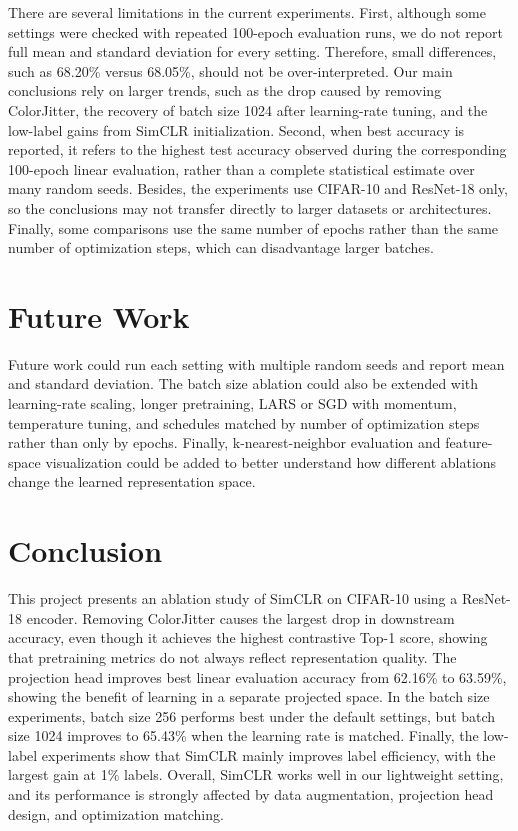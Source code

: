 \documentclass[10pt]{article}
\begin{document}
There are several limitations in the current experiments. First, although some settings were checked with repeated 100-epoch evaluation runs, we do not report full mean and standard deviation for every setting. Therefore, small differences, such as 68.20\% versus 68.05\%, should not be over-interpreted. Our main conclusions rely on larger trends, such as the drop caused by removing ColorJitter, the recovery of batch size 1024 after learning-rate tuning, and the low-label gains from SimCLR initialization. Second, when best accuracy is reported, it refers to the highest test accuracy observed during the corresponding 100-epoch linear evaluation, rather than a complete statistical estimate over many random seeds. Besides, the experiments use CIFAR-10 and ResNet-18 only, so the conclusions may not transfer directly to larger datasets or architectures. Finally, some comparisons use the same number of epochs rather than the same number of optimization steps, which can disadvantage larger batches.

\section{Future Work}

Future work could run each setting with multiple random seeds and report mean and standard deviation. The batch size ablation could also be extended with learning-rate scaling, longer pretraining, LARS or SGD with momentum, temperature tuning, and schedules matched by number of optimization steps rather than only by epochs. Finally, k-nearest-neighbor evaluation and feature-space visualization could be added to better understand how different ablations change the learned representation space.

\section{Conclusion}

This project presents an ablation study of SimCLR on CIFAR-10 using a ResNet-18 encoder. Removing ColorJitter causes the largest drop in downstream accuracy, even though it achieves the highest contrastive Top-1 score, showing that pretraining metrics do not always reflect representation quality. The projection head improves best linear evaluation accuracy from 62.16\% to 63.59\%, showing the benefit of learning in a separate projected space. In the batch size experiments, batch size 256 performs best under the default settings, but batch size 1024 improves to 65.43\% when the learning rate is matched. Finally, the low-label experiments show that SimCLR mainly improves label efficiency, with the largest gain at 1\% labels. Overall, SimCLR works well in our lightweight setting, and its performance is strongly affected by data augmentation, projection head design, and optimization matching.
\end{document}
